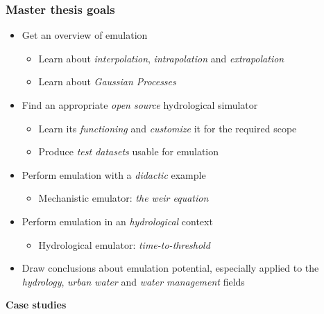 \documentclass[xcolor=dvipsnames, USenglish]{beamer}  %
\begin{document}
  \begin{frame}
    \frametitle{Master thesis goals}
    \begin{itemize}
      \item Get an overview of emulation
      \begin{itemize}
        \item Learn about \emph{interpolation}, \emph{intrapolation} and \emph{extrapolation}
        \item Learn about \emph{Gaussian Processes}
      \end{itemize}
      \item Find an appropriate \emph{open source} hydrological simulator
      \begin{itemize}
        \item Learn its \emph{functioning} and \emph{customize} it for the required scope
        \item Produce \emph{test datasets} usable for emulation
      \end{itemize}
      \item Perform emulation with a \emph{didactic} example
      \begin{itemize}
        \item Mechanistic emulator: \emph{the weir equation}
      \end{itemize}
      \item Perform emulation in an \emph{hydrological} context
      \begin{itemize}
        \item Hydrological emulator: \emph{time-to-threshold}
      \end{itemize}
      \item Draw conclusions about emulation potential, especially applied to the \emph{hydrology},
            \emph{urban water} and \emph{water management} fields
    \end{itemize}
  \end{frame}






  {
  \begin{frame}[plain]
    \centering
    \Large{\textbf{Case studies}}\\
  \end{frame}
  }
\end{document}
